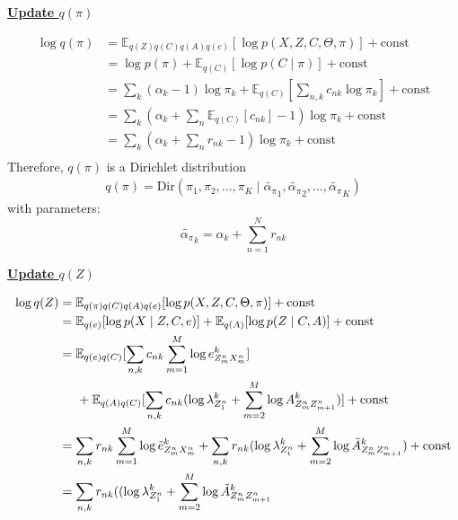 \documentclass[12pt]{article}
\newenvironment{problem}[2][Problem]{\begin{trivlist}
\item[\hskip \labelsep {\bfseries #1}\hskip \labelsep {\bfseries #2.}]}{\end{trivlist}}
\begin{document}
\begin{problem}{2.8.24}
\begin{flushleft}
    \textbf{\underline{Update $q(\pi)$}}
\end{flushleft}

\begin{align*}
    \log q(\pi) &= \mathbb{E}_{q(Z)q(C)q(A)q(e)}[\log p(X, Z, C, \Theta, \pi)] + \text{const} \\
    &= \log p(\pi) + \mathbb{E}_{q(C)}[\log p(C \mid \pi)] + \text{const} \\
    &= \sum_{k}(\alpha_k - 1)\log \pi_k + \mathbb{E}_{q(C)}[\sum_{n,k}c_{nk}\log\pi_k] + \text{const} \\
    &= \sum_{k}(\alpha_k + \sum_{n}\mathbb{E}_{q(C)}[c_{nk}] - 1)\log \pi_k + \text{const} \\
    &= \sum_{k}(\alpha_k + \sum_{n}r_{nk} - 1)\log \pi_k + \text{const} \\
\end{align*}
Therefore, $q(\pi)$ is a Dirichlet distribution 
\begin{align*}
    q(\pi) = \mathrm{Dir}(\pi_1, \pi_2, ..., \pi_K \mid 
    \tilde{\alpha_{\pi}}_1,\tilde{\alpha_{\pi}}_2,...,\tilde{\alpha_{\pi}}_K)
\end{align*}
with parameters:
\begin{equation}
    \tilde{\alpha_{\pi}}_k = \alpha_k + \sum_{n=1}^{N}r_{nk}
\end{equation}
\begin{flushleft}
    \textbf{\underline{Update $q(Z)$}}
\end{flushleft}
\begin{align*}
    \log q(Z) &= \mathbb{E}_{q(\pi)q(C)q(A)q(e)}[\log p(X, Z, C, \Theta, \pi)] + \text{const} \\
    &= \mathbb{E}_{q(e)}[\log p(X \mid Z, C, e)] + \mathbb{E}_{q(A)}[\log p(Z \mid C, A)]
       + \text{const} \\
    &= \mathbb{E}_{q(e)q(C)}[\sum_{n,k}c_{nk}\sum_{m=1}^{M}\log e^k_{Z^n_m X^n_m}] \\
    &\hspace{0.5cm}  + \mathbb{E}_{q(A)q(C)}[\sum_{n,k}c_{nk}(\log\lambda^k_{Z^n_{1}} + \sum_{m=2}^{M}\log A^k_{Z^n_{m}Z^n_{m+1}})]
       + \text{const} \\
    &= \sum_{n,k}r_{nk}\sum_{m=1}^{M}\log \tilde{e}^k_{Z^n_m X^n_m}
        + \sum_{n,k}r_{nk}(\log\lambda^k_{Z^n_{1}} + \sum_{m=2}^{M}\log \tilde{A}^k_{Z^n_{m}Z^n_{m+1}})
        + \text{const} \\
    &= \sum_{n,k}r_{nk}(
        (\log\lambda^k_{Z^n_{1}} + \sum_{m=2}^{M}\log \tilde{A}^k_{Z^n_{m}Z^n_{m+1}}

\end{align*}
\end{problem}
\end{document}
